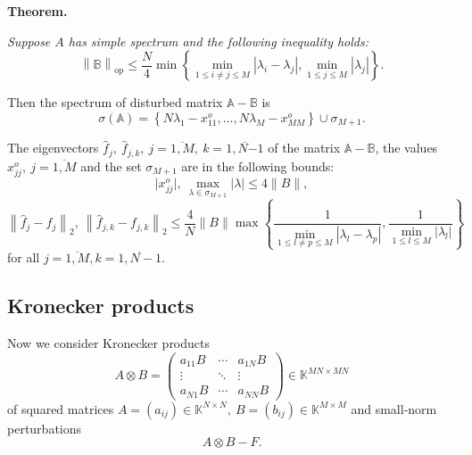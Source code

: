 \documentclass[a4paper]{jpconf}
\begin{document}
\begin{center}
\textbf{Theorem.}
{\it
Suppose \( A \) has simple spectrum and the following inequality holds:
\[
    \left\| \mathbb{B} \right\|_{\mathrm{op}}
        \leq 
        \frac{N}{4}
         \min\left\{
             \min\limits_{1\leq i{\neq}j \leq M }{|\lambda_i - \lambda_j|},
             \min\limits_{1\leq j \leq M}{|\lambda_j|}
         \right\}.
 \]

Then the spectrum of disturbed matrix \( \mathbb{A} - \mathbb{B} \) is
\[
    \sigma\left(\mathbb{A}\right) =
        \left\{
            N\lambda_1 - x_{11}^o, \ldots, N\lambda_M - x_{MM}^o
        \right\}
    \cup \sigma_{M{+}1}.
\]

The eigenvectors
    \( \hat{f}_j,\ \hat{f}_{j,k},\ j{=}\overline{1,M},\ k{=}\overline{1,N{-1}} \)
    of the matrix \( \mathbb{A}{-}\mathbb{B} \),
    the values \( x_{jj}^o,\ j{=}\overline{1,M} \)
    and the set \( \sigma_{M{+}1} \) are in the following bounds:
\[
    \lvert x_{jj}^o\rvert,
    \ \max_{\lambda\in\sigma_{M{+}1}} \lvert\lambda\rvert
    \leq 4\|B\|,
\]
\[
    \left\| \hat{f}_j - f_j \right\|_2,
    \ \left\| \hat{f}_{j,k} - f_{j,k}\right\|_2
    \leq
    \frac4N \|B\|
         \max\left\{
         \frac{1}{
             \min\limits_{1\leq l{\neq}p \leq M }{|\lambda_l - \lambda_p|}},
         \frac{1}{
             \min\limits_{1\leq l \leq M}{|\lambda_l|}}
         \right\}
\]
for all \( j{=}\overline{1,M}, k{=}\overline{1,N-1} \).
\/}
\end{center}

\subsection*{Kronecker products}

Now we consider Kronecker products
\[
    A\otimes B =
    \begin{pmatrix}
        a_{11} B & \cdots & a_{1N} B \\
        \vdots   & \ddots & \vdots \\
        a_{N1} B & \cdots & a_{NN} B
    \end{pmatrix}
    \in \mathbb{K}^{{MN}{\times}{MN}}
\]
of squared matrices
\( A={(a_{ij})}\in\mathbb{K}^{N{\times}N},
 \ B={(b_{ij})}\in\mathbb{K}^{M{\times}M} \)
and small-norm perturbations
\[
    A\otimes B - F.
\]

\end{document}
